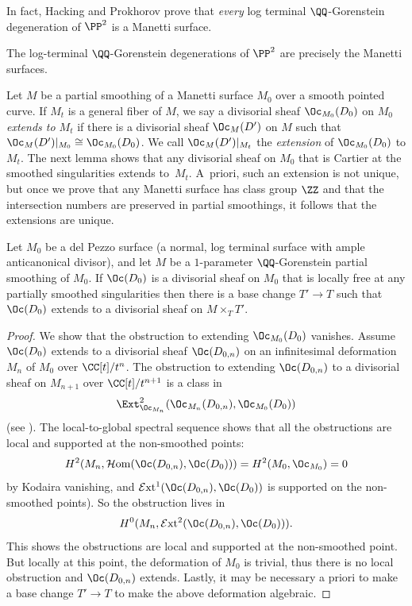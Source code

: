 In fact, Hacking and Prokhorov prove that \textit{every} log terminal $\QQ$-Gorenstein degeneration of $\PP^2$ is a Manetti surface.

\begin{theorem}\label{thm:manettisurfaces}
The log-terminal $\QQ$-Gorenstein degenerations of $\PP^2$ are precisely the Manetti surfaces.
\end{theorem}

Let $M$ be a partial smoothing of a Manetti surface $M_0$ over a smooth pointed curve. If $M_t$ is a general fiber of $M$, we say a divisorial sheaf $\Oc_{M_0}(D_0)$ on $M_0$ \textit{extends to $M_t$} if there is a divisorial sheaf $\Oc_{M}(D')$ on $M$ such that $\Oc_{M}(D')|_{M_0} \cong \Oc_{M_0}(D_0)$. We call $\Oc_{M}(D')|_{M_t}$ the \textit{extension} of $\Oc_{M_0}(D_0)$ to $M_t$. The next lemma shows that any divisorial sheaf on $M_0$ that is Cartier at the smoothed singularities extends to~$M_t$. A~priori, such an extension is not unique, but once we prove that any Manetti surface has class group $\ZZ$ and that the intersection numbers are preserved in partial smoothings, it follows that the extensions are unique.

\begin{lemma}\label{extendingdivisors}
Let $M_0$ be a del Pezzo surface (a normal, log terminal surface with ample anticanonical divisor), and let $M$ be a $1$-parameter $\QQ$-Gorenstein partial smoothing of $M_0$. If $\Oc(D_0)$ is a divisorial sheaf on $M_0$ that is locally free at any partially smoothed singularities then there is a base change $T'\to T$ such that $\Oc(D_0)$ extends to a divisorial sheaf on $M \times_T T'$.
\end{lemma}

\begin{proof}
We show that the obstruction to extending $\Oc_{M_0}(D_0)$ vanishes. Assume $\Oc(D_0)$ extends to a divisorial sheaf $\Oc(D_{0,n})$ on an infinitesimal deformation $M_n$ of $M_0$ over $\CC[t]/t^n$. The obstruction to extending $\Oc(D_{0,n})$ to a divisorial sheaf on $M_{n+1}$ over $\CC[t]/t^{n+1}$ is a class in
\[
\Ext^2_{\Oc_{M_n}}(\Oc_{M_n}(D_{0,n}),\Oc_{M_0}(D_0))
\]
(see \eg \cite[\href{https://stacks.math.columbia.edu/tag/08L8}{Tag 0ECH}]{stacks-project}). The local-to-global spectral sequence shows that all the obstructions are local and supported at the non-smoothed points: \[H^2(M_n,\mathcal{H}\mathrm{om}(\Oc(D_{0,n}),\Oc(D_0))) = H^2(M_0,\Oc_{M_0}) = 0\] by Kodaira vanishing, and $\mathcal{E}\mathrm{xt}^1(\Oc(D_{0,n}),\Oc(D_0))$ is supported on the non-smoothed points). So the obstruction lives in
\[
H^0(M_n,\mathcal{E}\mathrm{xt}^2(\Oc(D_{0,n}),\Oc(D_0))).
\]
This shows the obstructions are local and supported at the non-smoothed point. But locally at this point, the deformation of $M_0$ is trivial, thus there is no local obstruction and $\Oc(D_{0,n})$ extends. Lastly, it may be necessary a priori to make a base change $T'\to T$ to make the above deformation algebraic.
\end{proof}


